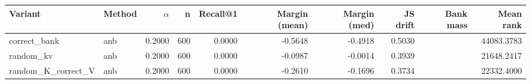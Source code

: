 \begin{tabular}{l l r r r r r r r r}
\toprule
Variant & Method & $\alpha$ & n & Recall@1 & Margin (mean) & Margin (med) & JS drift & Bank mass & Mean rank \\
\midrule
correct\_bank & anb & 0.2000 & 600 & 0.0000 & -0.5648 & -0.4918 & 0.5030 &  & 44083.3783 \\
random\_kv & anb & 0.2000 & 600 & 0.0000 & -0.0987 & -0.0014 & 0.3939 &  & 21648.2417 \\
random\_K\_correct\_V & anb & 0.2000 & 600 & 0.0000 & -0.2610 & -0.1696 & 0.3734 &  & 22332.4000 \\
\bottomrule
\end{tabular}
